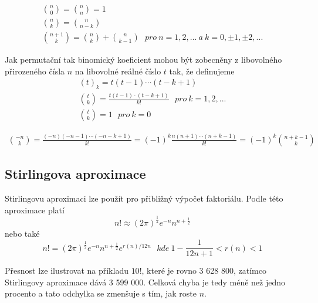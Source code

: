 \begin{theorem}
\begin{gather*}
\binom{n}{0} = \binom{n}{n} = 1\\
\binom{n}{k} = \binom{n}{n - k}\\
\binom{n + 1}{k} = \binom{n}{k} + \binom{n}{k - 1} ~~~\textit{pro}~ n = 1, 2, ... ~ \textit{a}~ k = 0, \pm 1, \pm 2, ...
\end{gather*}
\end{theorem}

Jak permutační tak binomický koeficient mohou být zobecněny z libovolného přirozeného čísla $n$ na libovolné reálné číslo $t$ tak, že definujeme
\begin{gather*}
(t)_k = t (t - 1) \cdots (t - k + 1)\\
\binom{t}{k} = \frac{t(t - 1)\cdot(t - k + 1)}{k!} ~~~\textit{pro}~ k = 1, 2, ...\\
\binom{t}{k} = 1 ~~~\textit{pro}~ k = 0 
\end{gather*}

\begin{theorem}
\begin{gather*}
\binom{-n}{k} = \frac{(-n)(-n - 1)\cdots(-n - k + 1)}{k!} = (-1)^k \frac{n(n + 1)\cdots(n + k - 1)}{k!} = (-1)^k \binom{n + k - 1}{k}
\end{gather*}
\end{theorem}

\subsection{Stirlingova aproximace}

\begin{definition}
Stirlingovu aproximaci lze použít pro přibližný výpočet faktoriálu. Podle této aproximace platí
\begin{equation*}
n! \approx (2 \pi)^{\frac{1}{2}}e^{-n}n^{n + \frac{1}{2}}
\end{equation*}
nebo také
\begin{equation*}
n! = (2 \pi)^{\frac{1}{2}}e^{-n} n^{n + \frac{1}{2}}e^{r(n)/12n} ~~~\textit{kde}~ 1 - \frac{1}{12n + 1} < r(n) < 1
\end{equation*}
\end{definition}

Přesnost lze ilustrovat na příkladu $10!$, které je rovno 3 628 800, zatímco Stirlingovy aproximace dává 3 599 000. Celková chyba je tedy méně než jedno procento a tato odchylka se zmenšuje s tím, jak roste $n$.

